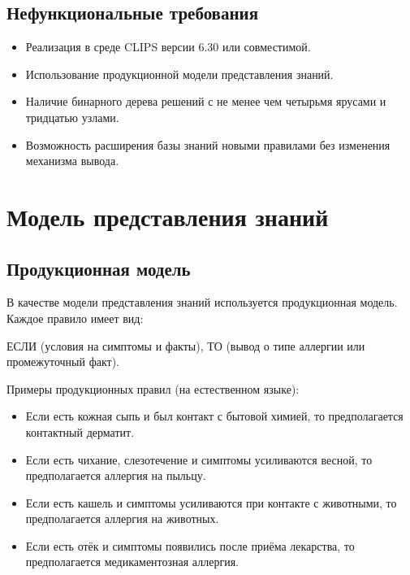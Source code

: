 \documentclass[a4paper,14pt]{extarticle}
\begin{document}
	\subsection{Нефункциональные требования}
	
	\begin{itemize}
		\item Реализация в среде CLIPS версии 6.30 или совместимой.
		\item Использование продукционной модели представления знаний.
		\item Наличие бинарного дерева решений с не менее чем четырьмя ярусами и тридцатью узлами.
		\item Возможность расширения базы знаний новыми правилами без изменения механизма вывода.
	\end{itemize}
	
	\newpage
	
	\section{Модель представления знаний}
	
	\subsection{Продукционная модель}
	
	В качестве модели представления знаний используется продукционная модель. Каждое правило имеет вид:
	
	
	
	ЕСЛИ (условия на симптомы и факты), ТО (вывод о типе аллергии или промежуточный факт).

	
	
	Примеры продукционных правил (на естественном языке):
	
	\begin{itemize}
		\item Если есть кожная сыпь и был контакт с бытовой химией, то предполагается контактный дерматит.
		\item Если есть чихание, слезотечение и симптомы усиливаются весной, то предполагается аллергия на пыльцу.
		\item Если есть кашель и симптомы усиливаются при контакте с животными, то предполагается аллергия на животных.
		\item Если есть отёк и симптомы появились после приёма лекарства, то предполагается медикаментозная аллергия.
	\end{itemize}
	
\end{document}
